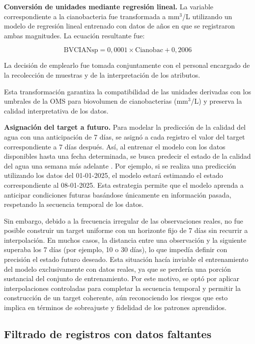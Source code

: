 \documentclass[
  11pt,
  pdftitle=TFI - Tschopp Joaquín S.,
  pdfauthor=Tschopp Joaquín S.,
  pdfcreator=LaTeX with hyperref,
]{report}  %
\begin{document}
\textbf{Conversión de unidades mediante regresión lineal.}  
La variable correspondiente a la cianobacteria fue transformada a mm$^{3}$/L utilizando un modelo de regresión lineal entrenado con datos de años en que se registraron ambas magnitudes. La ecuación resultante fue:

\[
\text{BVCIANsp} = 0{,}0001 \times \text{Cianobac} + 0{,}2006
\]

La decisión de emplearlo fue tomada conjuntamente con el personal encargado de la recolección de muestras y de la interpretación de los atributos.

Esta transformación garantiza la compatibilidad de las unidades derivadas con los umbrales de la OMS para biovolumen de cianobacterias (mm$^{3}$/L) y preserva la calidad interpretativa de los datos.

\textbf{Asignación del target a futuro.} 
Para modelar la predicción de la calidad del agua con una anticipación de 7 días, se asignó a cada registro el valor del target correspondiente a 7 días después. Así, al entrenar el modelo con los datos disponibles hasta una fecha determinada, se busca predecir el estado de la calidad del agua una semana más adelante \citep{datacamp2022forecasting}. Por ejemplo, si se realiza una predicción utilizando los datos del 01-01-2025, el modelo estará estimando el estado correspondiente al 08-01-2025. Esta estrategia permite que el modelo aprenda a anticipar condiciones futuras basándose únicamente en información pasada, respetando la secuencia temporal de los datos.


Sin embargo, debido a la frecuencia irregular de las observaciones reales, no fue posible construir un target uniforme con un horizonte fijo de 7 días sin recurrir a interpolación. En muchos casos, la distancia entre una observación y la siguiente superaba los 7 días (por ejemplo, 10 o 30 días), lo que impedía definir con precisión el estado futuro deseado. Esta situación hacía inviable el entrenamiento del modelo exclusivamente con datos reales, ya que se perdería una porción sustancial del conjunto de entrenamiento. Por este motivo, se optó por aplicar interpolaciones controladas para completar la secuencia temporal y permitir la construcción de un target coherente, aún reconociendo los riesgos que esto implica en términos de sobreajuste y fidelidad de los patrones aprendidos.


\subsection{Filtrado de registros con datos faltantes}
\end{document}

